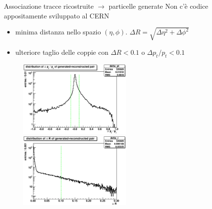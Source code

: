 \documentclass[italian]{beamer}
\begin{document}
\begin{frame}{Associazione tracce ricostruite $\to$ particelle generate}
    Non c'è codice appositamente sviluppato al CERN
\begin{itemize}
    \item minima distanza nello spazio $(\eta, \phi)$. $\Delta R =
        \sqrt{\Delta \eta^{2} + \Delta \phi^{2}}$
    \item ulteriore taglio delle coppie con $\Delta R < 0.1$ o $\Delta p_t /
        p_t < 0.1$
\end{itemize}
\begin{figure}[h]
    \includegraphics[width=0.5\textwidth]{crea_istogrammi/delta_pt.eps}
    \includegraphics[width=0.5\textwidth]{crea_istogrammi/delta_r.eps}
\end{figure}
\end{frame}
\end{document}
